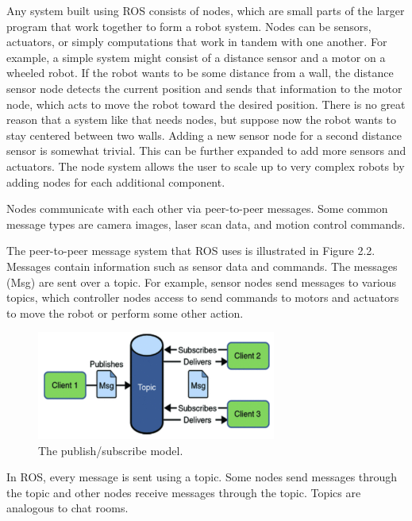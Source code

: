 \documentclass[twoside]{article}
\begin{document}
Any system built using ROS consists of nodes, which are small parts of the larger program that work together to form a robot system. Nodes can be sensors, actuators, or simply computations that work in tandem with one another. For example, a simple system might consist of a distance sensor and a motor on a wheeled robot. If the robot wants to be some distance from a wall, the distance sensor node detects the current position and sends that information to the motor node, which acts to move the robot toward the desired position. There is no great reason that a system like that needs nodes, but suppose now the robot wants to stay centered between two walls. Adding a new sensor node for a second distance sensor is somewhat trivial. This can be further expanded to add more sensors and actuators. The node system allows the user to scale up to very complex robots by adding nodes for each additional component.\\

\begin{frm-def}[Message]
Nodes communicate with each other via peer-to-peer messages. Some common message types are camera images, laser scan data, and motion control commands.
\end{frm-def}

The peer-to-peer message system that ROS uses is illustrated in Figure 2.2. Messages contain information such as sensor data and commands. The messages (Msg) are sent over a topic. For example, sensor nodes send messages to various topics, which controller nodes access to send commands to motors and actuators to move the robot or perform some other action.\\
   
\begin{figure}[ht]
\centering
\includegraphics[width=0.7\textwidth]{ChatRoom}
\caption{The publish/subscribe model.}
\end{figure}

\begin{frm-def}[Topic]
In ROS, every message is sent using a topic. Some nodes send messages through the topic and other nodes receive messages through the topic. Topics are analogous to chat rooms.
\end{frm-def}
\end{document}
